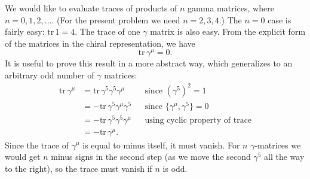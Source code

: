 We would like to evaluate traces of products of $n$ gamma matrices, where
$n = 0, 1, 2, \ldots$.  (For the present problem we need $n = 2, 3, 4$.)  The
$n=0$ case is fairly easy: $\mathrm{tr}\,1 = 4$.  The trace of one $\gamma$
matrix is also easy.  From the explicit form of the matrices in the chiral
representation, we have
\begin{equation}
  \mathrm{tr}\,\gamma^\mu = 0 .
\end{equation}
It is useful to prove this result in a more abstract way, which generalizes to
an arbitrary odd number of $\gamma$ matrices:
\begin{equation}
  \begin{aligned}
    \mathrm{tr}\,\gamma^\mu &= \mathrm{tr}\,\gamma^5\gamma^5\gamma^\mu
      &&\text{since } (\gamma^5)^2 = 1\\
    &= -\mathrm{tr}\,\gamma^5\gamma^\mu\gamma^5 &&\text{since }
      \{\gamma^\mu, \gamma^5\} = 0\\
    &= -\mathrm{tr}\,\gamma^5\gamma^5\gamma^\mu
      &&\text{using cyclic property of trace}\\
    &= -\mathrm{tr}\,\gamma^\mu .
  \end{aligned}
\end{equation}
Since the trace of $\gamma^\mu$ is equal to minus itself, it must vanish.  For
$n$ $\gamma$-matrices we would get $n$ minus signs in the second step (as we
move the second $\gamma^5$ all the way to the right), so the trace must vanish
if $n$ is odd.

